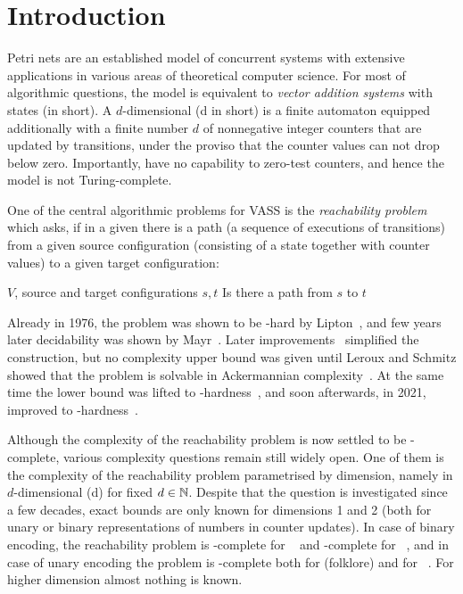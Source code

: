 
\section{Introduction}\label{sec:intro}

Petri nets are an established model of concurrent systems with extensive applications in various
areas of theoretical computer science.
For most of algorithmic questions, the model is equivalent to
\emph{vector addition systems} with states (\vass in short).
A $d$-dimensional \vass (\parvass d in short) is a finite automaton equipped additionally
with a finite number $d$ of nonnegative integer counters that are updated by
transitions, under the proviso that the counter values can not drop below zero.
Importantly, \vass have no capability to zero-test counters, and hence the model is not Turing-complete. 

One of the central algorithmic problems for VASS is the \emph{reachability problem} which asks,
if in a given \vass there is a path (a sequence of executions of transitions) 
from a given source configuration (consisting of a 
state together with counter values) to a given target configuration:

{\vass $V$, source and target configurations $s, t$}
{Is there a path from $s$ to $t$}

\noindent
Already in 1976, the problem was shown to be \expspace-hard by Lipton~\cite{Lipton76}, and
few years later decidability was shown by Mayr~\cite{Mayr81}.
Later improvements~\cite{DBLP:conf/stoc/Kosaraju82,DBLP:journals/tcs/Lambert92} simplified the construction, 
but no complexity upper bound was given until Leroux and Schmitz showed that the problem 
is solvable in Ackermannian complexity~\cite{LerouxS15,LS19}.
At the same time the lower bound was lifted to \tower-hardness~\cite{CzerwinskiLLLM21}, and soon
afterwards, in 2021, improved to \ackermann-hardness~\cite{DBLP:conf/focs/Leroux21,DBLP:conf/focs/CzerwinskiO21}.

Although the complexity of the reachability problem is now settled to be \ackermann-complete, 
various complexity questions remain still widely open.
%
One of them is the complexity of the reachability problem parametrised by dimension, namely in
$d$-dimensional \vass (\parvass d) for fixed $d \in \mathbb{N}$. 
Despite that the question is investigated since a few decades, 
exact bounds are only known for dimensions 1 and 2
(both for unary or binary representations of numbers in counter updates).
In case of binary encoding, the reachability problem is \np-complete
for ~\cite{DBLP:conf/concur/HaaseKOW09} and \pspace-complete 
for \dvass~\cite{BlondinFGHM15}, and in case of
unary encoding the problem is \nl-complete both for  (folklore) and for 
\dvass~\cite{DBLP:conf/lics/EnglertLT16}.
For higher dimension almost nothing is  known.

